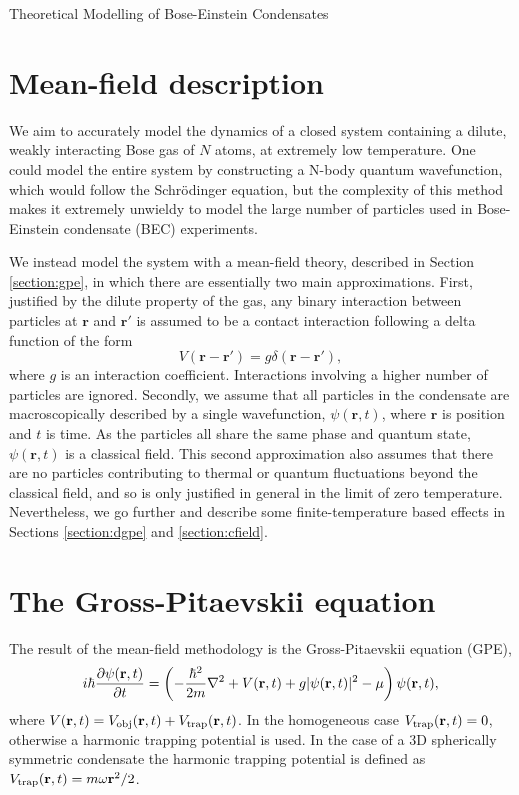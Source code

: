 \begin{chapter}{\label{cha:theoretical_model}Theoretical Modelling of Bose-Einstein Condensates}
\section{\label{section:meanfield} Mean-field description}
We aim to accurately model the dynamics of a closed system containing a dilute, weakly interacting Bose gas of $N$ atoms, at extremely low temperature. One could model the entire system by constructing a N-body quantum wavefunction, which would follow the Schr\"odinger equation, but the complexity of this method makes it extremely unwieldy to model the large number of particles used in Bose-Einstein condensate (BEC) experiments.

We instead model the system with a mean-field theory, described in Section \ref{section:gpe}, in which there are essentially two main approximations. First, justified by the dilute property of the gas, any binary interaction between particles at $\mathbf{r}$ and $\mathbf{r}'$ is assumed to be a contact interaction following a delta function of the form
\begin{equation*}
V(\mathbf{r}-\mathbf{r}') = g \delta(\mathbf{r}-\mathbf{r}'),
\end{equation*}
where $g$ is an interaction coefficient. Interactions involving a higher number of particles are ignored. Secondly, we assume that all particles in the condensate are macroscopically described by a single wavefunction, $\psi(\mathbf{r},t)$, where $\mathbf{r}$ is position and $t$ is time. As the particles all share the same phase and quantum state, $\psi(\mathbf{r},t)$ is a classical field. This second approximation also assumes that there are no particles contributing to thermal or quantum fluctuations beyond the classical field, and so is only justified in general in the limit of zero temperature. Nevertheless, we go further and describe some finite-temperature based effects in Sections \ref{section:dgpe}
and \ref{section:cfield}.

\section{\label{section:gpe} The Gross-Pitaevskii equation}
The result of the mean-field methodology is the Gross-Pitaevskii equation (GPE), 
\begin{equation}
i \hbar \frac{\partial\psi({\bf r},t)}{\partial t} = \left(-\frac{\hbar^2}{2m}\nabla^2 + V({\bf r},t) + g|\psi({\bf r},t)|^2 - \mu \right) \psi({\bf r},t),
\label{eq:gpe}
\end{equation}
where $V({\bf r},t) = V_{\mathrm{obj}}({\bf r},t) + V_{\mathrm{trap}}({\bf r},t)$. In the homogeneous case $V_{\mathrm{trap}}({\bf r},t)=0$, otherwise a harmonic trapping potential is used. In the case of a 3D spherically symmetric condensate the harmonic trapping potential is defined as $V_{\mathrm{trap}}({\bf r},t)=m\omega{\bf r}^2/2$.


\end{chapter}
